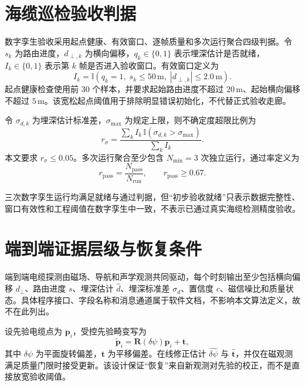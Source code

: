 \section{海缆巡检验收判据}\label{sec:app-a-8}

数字孪生验收采用起点健康、有效窗口、逐帧质量和多次运行聚合四级判据。令 \(s_k\) 为路由进度，\(d_{\perp,k}\) 为横向偏移，\(q_k\in\{0,1\}\) 表示埋深估计是否就绪，\(I_k\in\{0,1\}\) 表示第 \(k\) 帧是否进入验收窗口。有效窗口定义为
\begin{equation}
  I_k=
  \mathbb{I}
  \left(
    q_k=1,\;
    s_k\le50\,\mathrm{m},\;
    |d_{\perp,k}|\le2.0\,\mathrm{m}
  \right).
  \label{eq:app-valid-window}
\end{equation}
起点健康检查使用前 \(30\) 个样本，并要求起始路由进度不超过 \(20\,\mathrm{m}\)、起始横向偏移不超过 \(5\,\mathrm{m}\)。该宽松起点阈值用于排除明显错误初始化，不代替正式验收走廊。

令 \(\sigma_{d,k}\) 为埋深估计标准差，\(\sigma_{\max}\) 为规定上限，则不确定度超限比例为
\begin{equation}
  r_\sigma=
  \frac{
    \sum_k I_k\,
    \mathbb{I}(\sigma_{d,k}>\sigma_{\max})
  }{
    \sum_k I_k
  }.
  \label{eq:app-uncertainty-exceed}
\end{equation}
本文要求 \(r_\sigma\le0.05\)。多次运行聚合至少包含 \(N_{\min}=3\) 次独立运行，通过率定义为
\begin{equation}
  r_{\mathrm{pass}}=
  \frac{N_{\mathrm{pass}}}{N_{\mathrm{run}}},
  \qquad
  r_{\mathrm{pass}}\ge0.67.
  \label{eq:app-pass-rate}
\end{equation}

三次数字孪生运行均满足就绪与通过判据，但“初步验收就绪”只表示数据完整性、窗口有效性和工程阈值在数字孪生中一致，不表示已通过真实海缆检测精度验收。

\section{端到端证据层级与恢复条件}\label{sec:app-a-9}

端到端电缆探测由磁场、导航和声学观测共同驱动，每个时刻输出至少包括横向偏移 \(d_\perp\)、路由进度 \(s\)、埋深估计 \(\hat d\)、埋深标准差 \(\sigma_d\)、置信度 \(c\)、磁信噪比和质量状态。具体程序接口、字段名称和消息通道属于软件文档，不影响本文算法定义，故不在此列出。

设先验电缆点为 \(\boldsymbol p_i\)，受控先验畸变写为
\begin{equation}
  \tilde{\boldsymbol p}_i
  =
  \boldsymbol R(\delta\psi)\boldsymbol p_i
  +\boldsymbol t,
  \label{eq:app-prior-distortion}
\end{equation}
其中 \(\delta\psi\) 为平面旋转偏差，\(\boldsymbol t\) 为平移偏差。在线修正估计 \(\hat{\delta\psi}\) 与 \(\hat{\boldsymbol t}\)，并仅在磁观测满足质量门限时接受更新。该设计保证“恢复”来自新观测对先验的校正，而不是直接放宽验收阈值。

